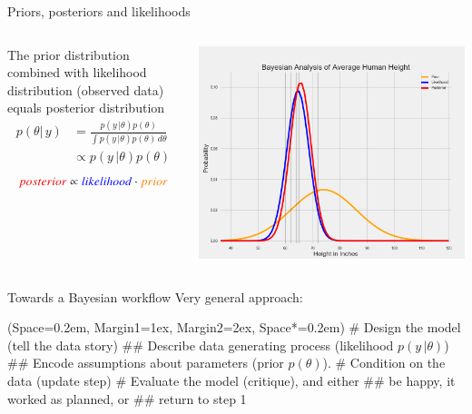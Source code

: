 \documentclass[12pt, aspectratio=149]{beamer}
\newcommand{\listSpace}{0.2em}
\theoremstyle{plain}
\begin{document}
\begin{frame}[fragile]{Priors, posteriors and likelihoods}
	\begin{columns}
		\begin{column}{0.5\linewidth}
			The prior distribution combined with likelihood distribution (observed data) equals posterior distribution
			\begin{equation*}
			\begin{split}
			p(\theta \vert \, y) & =  \frac{p(y \, \vert \theta)p(\theta)}{\int p(y \, \vert \theta)p(\theta) \, d\theta} \\
			& \propto p(y \, \vert \theta)p(\theta)
			\end{split}
			\end{equation*}
			\begin{equation*}
			\textcolor{red}{posterior} \propto \textcolor{blue}{likelihood} \cdot \textcolor{orange}{prior}
			\end{equation*}
		\end{column}
		\begin{column}{0.5\linewidth}
			\includegraphics[scale=0.17]{figs/prior_likelihood_posterior_example.png}
		\end{column}
	\end{columns}
\end{frame}

\begin{frame}[fragile]{Towards a Bayesian workflow}
	Very general approach:
	\begin{easylist}[enumerate]
		\ListProperties(Space=\listSpace, Margin1=1ex, Margin2=2ex, Space*=\listSpace)
		# Design the model (tell the data story)
		## Describe data generating process (likelihood $p(y \, \vert \theta)$)
		## Encode assumptions about parameters (prior $p(\theta)$).
		# Condition on the data (update step)
		# Evaluate the model (critique), and either
		## be happy, it worked as planned, or
		## return to step 1
	\end{easylist}
\end{frame}
\end{document}

